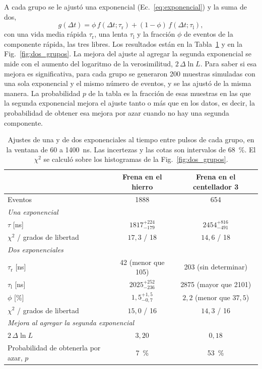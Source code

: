 A cada grupo se le ajustó una exponencial (Ec.~\ref{eq:exponencial}) y la suma de
dos,
\begin{equation}
    g(\Delta t) = \phi\, f(\Delta t;\tau_\text{r}) + (1-\phi)\, f(\Delta t;\tau_\text{l}) ,
    \label{eq:dos_exponenciales}
\end{equation}
con una vida media rápida $\tau_\text{r}$, una lenta $\tau_\text{l}$ y la fracción
$\phi$ de eventos de la componente rápida, las tres libres. Los resultados están
en la Tabla~\ref{tab:dos_grupos} y en la Fig.~\ref{fig:dos_grupos}. La mejora del
ajuste al agregar la segunda exponencial se mide con el aumento del logaritmo de
la verosimilitud, $2\,\Delta\ln L$. Para saber si esa mejora es significativa, para
cada grupo se generaron 200 muestras simuladas con una sola exponencial y el mismo
número de eventos, y se las ajustó de la misma manera. La probabilidad $p$ de la
tabla es la fracción de esas muestras en las que la segunda exponencial mejora el
ajuste tanto o más que en los datos, es decir, la probabilidad de obtener esa
mejora por azar cuando no hay una segunda componente.

\begin{table}[htbp]
    \centering
    \begin{tabular}{lcc}
        \hline
         & Frena en el hierro & Frena en el centellador 3 \\
        \hline
        Eventos & 1888 & 654 \\
        \hline
        \multicolumn{3}{l}{\textit{Una exponencial}} \\
        $\tau$ [ns] & $1817^{+224}_{-179}$ & $2454^{+816}_{-491}$ \\
        $\chi^2$ / grados de libertad & $17{,}3$ / 18 & $14{,}6$ / 18 \\
        \hline
        \multicolumn{3}{l}{\textit{Dos exponenciales}} \\
        $\tau_\text{r}$ [ns] & 42 (menor que 105) & 203 (sin determinar) \\
        $\tau_\text{l}$ [ns] & $2025^{+252}_{-236}$ & 2875 (mayor que 2101) \\
        $\phi$ [\%] & $1{,}5^{+1{,}5}_{-0{,}7}$ & $2{,}2$ (menor que $37{,}5$) \\
        $\chi^2$ / grados de libertad & $15{,}0$ / 16 & $14{,}3$ / 16 \\
        \hline
        \multicolumn{3}{l}{\textit{Mejora al agregar la segunda exponencial}} \\
        $2\,\Delta\ln L$ & $3{,}20$ & $0{,}18$ \\
        Probabilidad de obtenerla por azar, $p$ & 7~\% & 53~\% \\
        \hline
    \end{tabular}
    \caption{Ajustes de una y de dos exponenciales al tiempo entre pulsos de cada
    grupo, en la ventana de 60 a 1400~ns. Las incertezas y las cotas son intervalos
    de 68~\%. El $\chi^2$ se calculó sobre los histogramas de la
    Fig.~\ref{fig:dos_grupos}.}
    \label{tab:dos_grupos}
\end{table}

